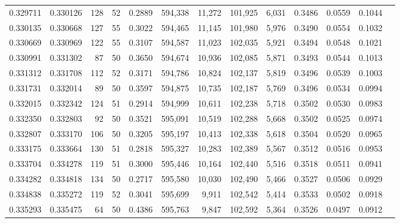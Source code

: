 \begin{tabular}{rrrrrrrrrrrrr}
0.329711 & 0.330126 &   128 &  52 &                                     0.2889 & 594,338 &  11,272 & 101,925 &   6,031 & 0.3486 & 0.0559 & 0.1044 \\
0.330135 & 0.330668 &   127 &  55 &                                     0.3022 & 594,465 &  11,145 & 101,980 &   5,976 & 0.3490 & 0.0554 & 0.1032 \\
0.330669 & 0.330969 &   122 &  55 &                                     0.3107 & 594,587 &  11,023 & 102,035 &   5,921 & 0.3494 & 0.0548 & 0.1021 \\
0.330991 & 0.331302 &    87 &  50 &                                     0.3650 & 594,674 &  10,936 & 102,085 &   5,871 & 0.3493 & 0.0544 & 0.1013 \\
0.331312 & 0.331708 &   112 &  52 &                                     0.3171 & 594,786 &  10,824 & 102,137 &   5,819 & 0.3496 & 0.0539 & 0.1003 \\
0.331731 & 0.332014 &    89 &  50 &                                     0.3597 & 594,875 &  10,735 & 102,187 &   5,769 & 0.3496 & 0.0534 & 0.0994 \\
0.332015 & 0.332342 &   124 &  51 &                                     0.2914 & 594,999 &  10,611 & 102,238 &   5,718 & 0.3502 & 0.0530 & 0.0983 \\
0.332350 & 0.332803 &    92 &  50 &                                     0.3521 & 595,091 &  10,519 & 102,288 &   5,668 & 0.3502 & 0.0525 & 0.0974 \\
0.332807 & 0.333170 &   106 &  50 &                                     0.3205 & 595,197 &  10,413 & 102,338 &   5,618 & 0.3504 & 0.0520 & 0.0965 \\
0.333175 & 0.333664 &   130 &  51 &                                     0.2818 & 595,327 &  10,283 & 102,389 &   5,567 & 0.3512 & 0.0516 & 0.0953 \\
0.333704 & 0.334278 &   119 &  51 &                                     0.3000 & 595,446 &  10,164 & 102,440 &   5,516 & 0.3518 & 0.0511 & 0.0941 \\
0.334282 & 0.334818 &   134 &  50 &                                     0.2717 & 595,580 &  10,030 & 102,490 &   5,466 & 0.3527 & 0.0506 & 0.0929 \\
0.334838 & 0.335272 &   119 &  52 &                                     0.3041 & 595,699 &   9,911 & 102,542 &   5,414 & 0.3533 & 0.0502 & 0.0918 \\
0.335293 & 0.335475 &    64 &  50 &                                     0.4386 & 595,763 &   9,847 & 102,592 &   5,364 & 0.3526 & 0.0497 & 0.0912 \\

\end{tabular}
